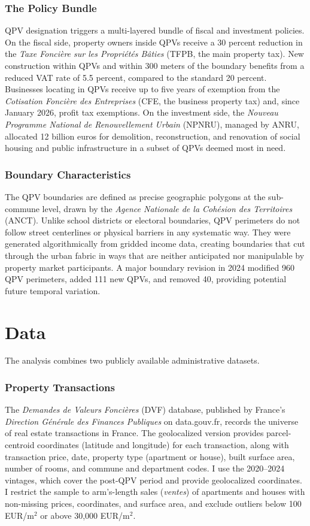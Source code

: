 \documentclass[12pt]{article}
\begin{document}
\subsubsection*{The Policy Bundle} QPV designation triggers a multi-layered bundle of fiscal and investment policies. On the fiscal side, property owners inside QPVs receive a 30 percent reduction in the \textit{Taxe Fonci\`{e}re sur les Propri\'{e}t\'{e}s B\^{a}ties} (TFPB, the main property tax). New construction within QPVs and within 300 meters of the boundary benefits from a reduced VAT rate of 5.5 percent, compared to the standard 20 percent. Businesses locating in QPVs receive up to five years of exemption from the \textit{Cotisation Fonci\`{e}re des Entreprises} (CFE, the business property tax) and, since January 2026, profit tax exemptions. On the investment side, the \textit{Nouveau Programme National de Renouvellement Urbain} (NPNRU), managed by ANRU, allocated 12 billion euros for demolition, reconstruction, and renovation of social housing and public infrastructure in a subset of QPVs deemed most in need.

\subsubsection*{Boundary Characteristics} The QPV boundaries are defined as precise geographic polygons at the sub-commune level, drawn by the \textit{Agence Nationale de la Coh\'{e}sion des Territoires} (ANCT). Unlike school districts or electoral boundaries, QPV perimeters do not follow street centerlines or physical barriers in any systematic way. They were generated algorithmically from gridded income data, creating boundaries that cut through the urban fabric in ways that are neither anticipated nor manipulable by property market participants. A major boundary revision in 2024 modified 960 QPV perimeters, added 111 new QPVs, and removed 40, providing potential future temporal variation.


\section{Data}

The analysis combines two publicly available administrative datasets.

\subsubsection*{Property Transactions} The \textit{Demandes de Valeurs Fonci\`{e}res} (DVF) database, published by France's \textit{Direction G\'{e}n\'{e}rale des Finances Publiques} on data.gouv.fr, records the universe of real estate transactions in France. The geolocalized version provides parcel-centroid coordinates (latitude and longitude) for each transaction, along with transaction price, date, property type (apartment or house), built surface area, number of rooms, and commune and department codes. I use the 2020--2024 vintages, which cover the post-QPV period and provide geolocalized coordinates. I restrict the sample to arm's-length sales (\textit{ventes}) of apartments and houses with non-missing prices, coordinates, and surface area, and exclude outliers below 100 EUR/m$^2$ or above 30,000 EUR/m$^2$.
\end{document}
